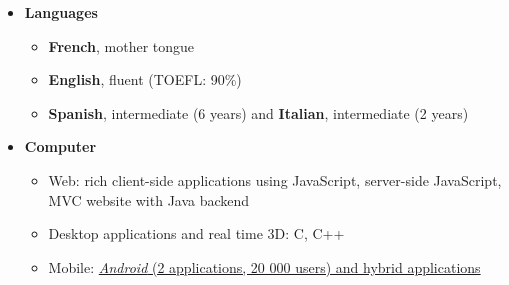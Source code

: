\documentclass[a4paper,11pt]{article} %
\newcommand{\trad}[2]{#1}
\newenvironment{customitemize}[0]
  { \begin{itemize}
    \addtolength{\itemsep}{\trad{-0.2}{0}\baselineskip}
    \addtolength{\baselineskip}{\trad{-0.2}{0}\baselineskip} }
  { \end{itemize} }
\begin{document}
\begin{customitemize}
\item \textbf{\trad{Languages}{Langues}}
	\begin{itemize} 
	\trad{\item \textbf{French}, mother tongue}{}
	\item \trad{\textbf{English}, fluent (TOEFL: 90\%)} %
				{\textbf{Anglais}, autonome (TOEFL: 90\%)} %
	\item \trad{\textbf{Spanish}, intermediate (6 years) and \textbf{Italian}, intermediate (2 years)} %
				{\textbf{Espagnol}, niveau intermédiaire (6 ans) et \textbf{Italien}, niveau intermédiaire (2 ans)}
	\end{itemize}
\item \textbf{\trad{Computer}{Informatique}}
	\begin{itemize}
	\item \trad{Web: rich client-side applications using JavaScript, server-side JavaScript, MVC website with Java backend}								{Sites web et RIA : HTML, CSS, SVG, Javascript, Java}
	\item \trad{Desktop applications and real time 3D: C, C++}									{Applications de bureau et 3D temps réel : C, C++}
	\item \trad{Mobile: \href{https://market.android.com/developer?pub=Steren+Giannini}{\textit{Android} (2 applications, 20 000 users) and hybrid applications}}									  					{Mobile : \href{https://market.android.com/developer?pub=Steren+Giannini}{\textit{Android} (2 applications, 20 000 utilisateurs)}}
	\end{itemize}
\end{customitemize}
\end{document}
